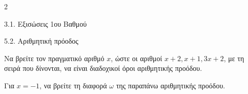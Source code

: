 \begin{ylh}{2}
    \item 3.1. Εξισώσεις 1ου Βαθμού
    \item 5.2. Αριθμητική πρόοδος
\end{ylh}

\begin{alist}
\item Να βρείτε τον πραγματικό αριθμό $x$, ώστε οι αριθμοί $x + 2, x + 1, 3x + 2$, με τη σειρά που δίνονται, να είναι διαδοχικοί όροι αριθμητικής προόδου.
\item Για $x = -1$, να βρείτε τη διαφορά $\omega$ της παραπάνω αριθμητικής προόδου.
\end{alist}


